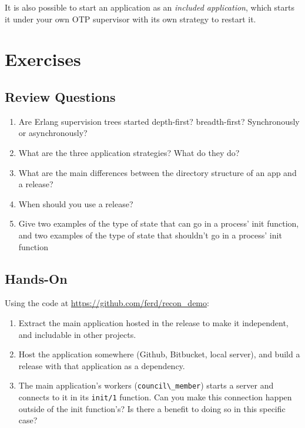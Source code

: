 \documentclass[11pt, oneside]{book}   	%
\newcommand{\module}[1]{\Verb`#1`}
\newcommand{\function}[1]{\Verb`#1`}
\begin{document}
It is also possible to start an application as an \emph{included application}, which starts it under your own OTP supervisor with its own strategy to restart it.

\section{Exercises}

\subsection{Review Questions}

\begin{enumerate}
	\item  Are Erlang supervision trees started depth-first? breadth-first? Synchronously or asynchronously?
	\item What are the three application strategies? What do they do?
	\item What are the main differences between the directory structure of an app and a release?
	\item When should you use a release?
	\item Give two examples of the type of state that can go in a process' init function, and two examples of the type of state that shouldn't go in a process' init function
\end{enumerate}

\subsection{Hands-On}

Using the code at \href{https://github.com/ferd/recon\_demo}{https://github.com/ferd/recon\_demo}:

\begin{enumerate}
	\item Extract the main application hosted in the release to make it independent, and includable in other projects.
	\item Host the application somewhere (Github, Bitbucket, local server), and build a release with that application as a dependency.
	\item The main application's workers (\module{council\_member}) starts a server and connects to it in its \function{init/1} function. Can you make this connection happen outside of the init function's? Is there a benefit to doing so in this specific case?
\end{enumerate}
\end{document}
